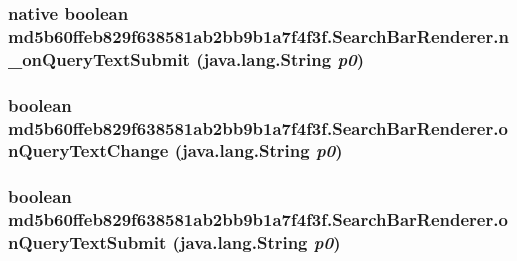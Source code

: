 \hypertarget{classmd5b60ffeb829f638581ab2bb9b1a7f4f3f_1_1_search_bar_renderer_abe14e5f9bd2010409ee2224b5066103}{
\subsubsection[{n\_\-onQueryTextSubmit}]{\setlength{\rightskip}{0pt plus 5cm}native boolean md5b60ffeb829f638581ab2bb9b1a7f4f3f.SearchBarRenderer.n\_\-onQueryTextSubmit (java.lang.String {\em p0})}}
\label{classmd5b60ffeb829f638581ab2bb9b1a7f4f3f_1_1_search_bar_renderer_abe14e5f9bd2010409ee2224b5066103}


\hypertarget{classmd5b60ffeb829f638581ab2bb9b1a7f4f3f_1_1_search_bar_renderer_53f7d71599559efcc390efdec95a3527}{
\subsubsection[{onQueryTextChange}]{\setlength{\rightskip}{0pt plus 5cm}boolean md5b60ffeb829f638581ab2bb9b1a7f4f3f.SearchBarRenderer.onQueryTextChange (java.lang.String {\em p0})}}
\label{classmd5b60ffeb829f638581ab2bb9b1a7f4f3f_1_1_search_bar_renderer_53f7d71599559efcc390efdec95a3527}


\hypertarget{classmd5b60ffeb829f638581ab2bb9b1a7f4f3f_1_1_search_bar_renderer_69d8a7b933f0c7ac02d7d945868f8037}{
\subsubsection[{onQueryTextSubmit}]{\setlength{\rightskip}{0pt plus 5cm}boolean md5b60ffeb829f638581ab2bb9b1a7f4f3f.SearchBarRenderer.onQueryTextSubmit (java.lang.String {\em p0})}}
\label{classmd5b60ffeb829f638581ab2bb9b1a7f4f3f_1_1_search_bar_renderer_69d8a7b933f0c7ac02d7d945868f8037}




